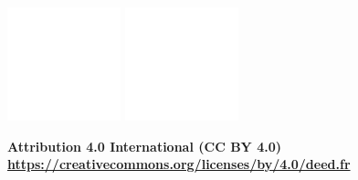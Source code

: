 \documentclass[12pt]{book}
\begin{document}
\begin{tcolorbox}[colback=cyan,
	colframe=cyan,  
	arc=0pt,outer arc=0pt,
	valign=top, 
	halign=center,
	width=\textwidth]
	
	\includegraphics[width=.5cm]{../img/licence/cc_icon_white_x2.png}
	\includegraphics[width=.5cm]{../img/licence/attribution_icon_white_x2.png}
	
	\color{white}
	\bfseries Attribution 4.0 International (CC BY 4.0) \\
	\tiny \url{https://creativecommons.org/licenses/by/4.0/deed.fr}
	
\end{tcolorbox}\vspace{-.5cm}
\end{document}
